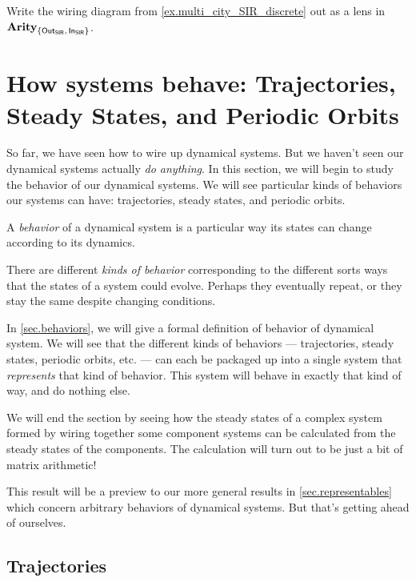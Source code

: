 \documentclass[DynamicalBook]{subfiles}
\begin{document}
\begin{exercise}

  
  Write the wiring diagram from \cref{ex.multi_city_SIR_discrete} out as a lens
  in $\textbf{Arity}_{\{\mathsf{Out}_{\mathsf{SIR}},\, \mathsf{In}_{\mathsf{SIR}} \}}$.
\end{exercise}

\section[How systems behave: Trajectories, Steady States, etc.]{How systems behave: Trajectories, Steady States, and Periodic Orbits}  \label{sec.trajectories_discrete}

So far, we have seen how to wire up dynamical systems. But we haven't seen our
dynamical systems actually \emph{do anything}. In this section, we will begin to
study the behavior of our dynamical systems. We will see particular kinds of
behaviors our systems can have:
trajectories, steady states, and periodic orbits.

\begin{informal}
  A \emph{behavior} of a dynamical system is a particular way its states can
  change according to its dynamics.  

  There are different \emph{kinds of behavior} corresponding to the different
  sorts ways that the states of a system could evolve. Perhaps they eventually
  repeat, or they stay the same despite changing conditions.
\end{informal}

In \cref{sec.behaviors}, we will give a formal definition of behavior of
dynamical system. We will see that the different kinds of behaviors ---
trajectories, steady states, periodic orbits, etc. --- can each
be packaged up into a single system that \emph{represents} that kind of
behavior. This system will behave in exactly that kind of way, and do nothing else.

We will end the section by seeing how the steady states of a complex system formed by wiring together some
component systems can be calculated from the steady states of the components.
The calculation will turn out to be just a bit of matrix arithmetic!

This result will be a preview to our more general results in
\cref{sec.representables} which concern arbitrary behaviors of dynamical
systems. But that's
getting ahead of ourselves.

\subsection{Trajectories}\label{sec.trajectory_discrete}
\end{document}

